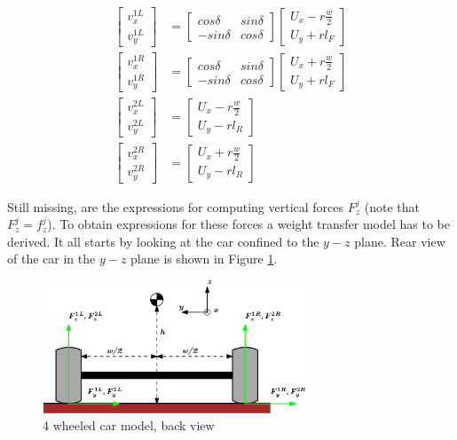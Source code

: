 \documentclass[paper=a4, fontsize=11pt]{scrartcl} %
\numberwithin{equation}{section} %
\numberwithin{figure}{section} %
\numberwithin{table}{section} %
\begin{document}
\begin{align}
\begin{bmatrix}
v^{1L}_x \\
v^{1L}_y
\end{bmatrix} & = \begin{bmatrix}
cos\delta & sin\delta \\
-sin\delta & cos\delta
\end{bmatrix} \begin{bmatrix}
U_x - r\frac{w}{2} \\
U_y + r l_F
\end{bmatrix} \\
\begin{bmatrix}
v^{1R}_x \\
v^{1R}_y
\end{bmatrix} & = \begin{bmatrix}
cos\delta & sin\delta \\
-sin\delta & cos\delta
\end{bmatrix} \begin{bmatrix}
U_x + r\frac{w}{2} \\
U_y + r l_F
\end{bmatrix} \\
\begin{bmatrix}
v^{2L}_x \\
v^{2L}_y
\end{bmatrix} & = \begin{bmatrix}
U_x - r\frac{w}{2} \\
U_y - r l_R
\end{bmatrix}\\
\begin{bmatrix}
v^{2R}_x \\
v^{2R}_y
\end{bmatrix} & = \begin{bmatrix}
U_x + r\frac{w}{2} \\
U_y - r l_R
\end{bmatrix}
\end{align}

Still missing, are the expressions for computing vertical forces $F^j_z$ (note that $F^j_z = f^j_z$). To obtain expressions for these forces a weight transfer model has to be derived. It all starts by looking at the car confined to the $y-z$ plane. Rear view of the car in the $y-z$ plane is shown in Figure \ref{4wheelYZplane}.

\begin{figure}[h!]
	\centering
	\includegraphics[width=0.7\textwidth]{drawings/4wheelYZplane.png}
	\caption{4 wheeled car model, back view}
	\label{4wheelYZplane}
\end{figure}
\end{document}
